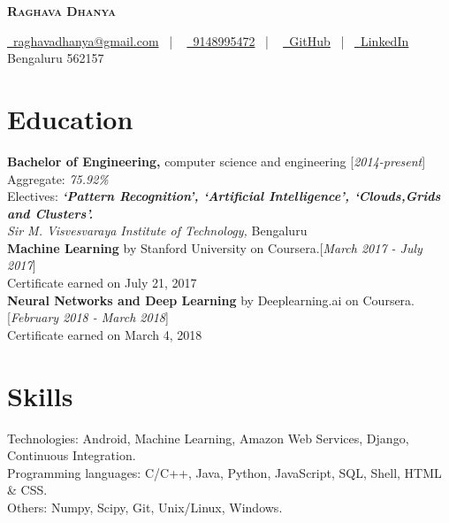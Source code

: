 \documentclass[10pt]{article}
\begin{document}
\thispagestyle{empty}

\begin{center}
 \textbf{\textsc{\color{anotherred}\Huge Raghava Dhanya}}\\[10pt] %
\end{center}

\begin{center}
 \href{mailto:raghavadhanya@gmail.com}{\faEnvelope\ raghavadhanya@gmail.com}
 \ | \ %
 \href{tel:9148995472}{\faPhoneSquare\ 9148995472} \ | \ %
 \href{https://github.com/RaghavaDhanya}{ \underline{\faGithubSquare\
 GitHub}} \ | \ \href{https://in.linkedin.com/in/raghavadhanya}{\underline
 {\faLinkedinSquare\ LinkedIn}} \\
 Bengaluru 562157
\end{center}

\section{Education} \textbf{Bachelor of Engineering,} computer science
and engineering \hfill [\textit{2014-present}]\\
Aggregate: \textit{75.92\%}\\
Electives: \textbf{\textit{`Pattern Recognition', `Artificial Intelligence',
`Clouds,Grids and Clusters'.}}\\
\textit{Sir M. Visvesvaraya Institute of Technology,} Bengaluru
\medskip
\\
\textbf{Machine Learning} by Stanford University on Coursera.\hfill [\textit
{March 2017 - July 2017}]\\
Certificate earned on July 21, 2017
\medskip\\ 
\textbf{Neural Networks and Deep Learning} by Deeplearning.ai on Coursera.\hfill [\textit
{February 2018 - March 2018}]\\
Certificate earned on March 4, 2018 

\section{Skills} Technologies: Android, Machine Learning, Amazon Web
Services, Django, Continuous Integration.\\
Programming languages: C/C++, Java, Python, JavaScript, SQL, Shell,
HTML \& CSS.\\
Others: Numpy, Scipy, Git, Unix/Linux, Windows. 
\end{document}
